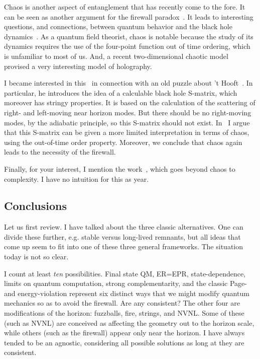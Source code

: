 \documentclass[12pt]{article}
\begin{document}
Chaos is another aspect of entanglement that has recently come to the fore.  It can be seen as another argument for the firewall paradox~\cite{Almheiri:2013hfa,Shenker:2013pqa}.    It leads to interesting questions, and connections, between quantum behavior and the black hole dynamics~\cite{Shenker:2013pqa,Shenker:2014cwa,kitaev,Maldacena:2015waa}.  As a quantum field theorist, chaos is notable because the study of its dynamics requires the use of the four-point function out of time ordering, which is unfamiliar to most of us.  And, a recent two-dimensional chaotic model~\cite{kitaev,Sachdev:1992fk,Polchinski:2016xgd} provised a very interesting model of holography.
  
I became interested in this~\cite{Polchinski:2015cea} in connection with an old puzzle about 't Hooft~\cite{Dray:1984ha,'tHooft:1996tq}.  In particular, he introduces the idea of a calculable black hole S-matrix, which moreover has stringy properties.   It is based on the calculation of the scattering of right- and left-moving near horizon modes.  But there should be no right-moving modes, by the adiabatic principle, so this S-matrix should not exist.  In~\cite{Polchinski:2015cea} I argue that this S-matrix can be given a more limited interpretation in terms of chaos, using the out-of-time order property.  Moreover, we conclude that chaos again leads to the necessity of the firewall.

Finally, for your interest, I mention the work~\cite{Brown:2015bva}, which goes beyond chaos to complexity.  I have no intuition for this as year.
 
  \subsection{Conclusions}

Let us first review.
I have talked about the three classic alternatives.  One can divide these further, e.g. stable versus long-lived remnants, but all ideas that come up seem to fit into one of these three general frameworks.  The situation today is not so clear.  

I count at least {\it ten} possibilities.  Final state QM, ER=EPR, state-dependence, limits on quantum computation, strong complementarity, and the classic Page- and energy-violation represent six distinct ways that we might modify quantum mechanics so as to avoid the firewall.  Are any consistent?  The other four are modifications of the horizon:  fuzzballs, fire, strings, and NVNL.  Some of these (such as NVNL) are conceived as affecting the geometry out to the horizon scale, while others (such as the firewall) appear only near the horizon.  I have always tended to be an agnostic, considering all possible solutions as long at they are consistent.  
\end{document}
